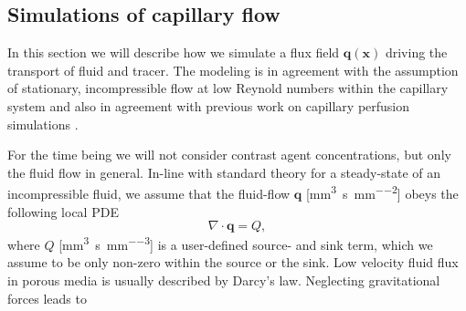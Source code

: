 \documentclass[journal,twocolumn]{IEEEtran}
\newcommand{\vq}{\mathbf{q}}
\newcommand{\vx}{\mathbf{x}}
\newcommand{\siQmm}{\milli\meter\cubed\per\second\per\milli\meter\cubed}
\newcommand{\siq}{\milli\meter\cubed\per\second\per\milli\meter\squared}
\newcommand{\siQtilde}{\milli\gram\per\second\per\milli\meter\cubed}
\begin{document}
	

	\subsection{Simulations of capillary flow}\label{sec:flow}
	In this section we will describe how we simulate a flux field $\vq(\vx)$ driving the transport of fluid and tracer.
	The modeling is in agreement with the assumption of stationary, incompressible flow at low Reynold numbers within the capillary system \cite{Cho2011} and also in agreement with previous work on capillary perfusion simulations \cite{Cookson2012,Michler2013}. 

	For the time being we will not consider contrast agent concentrations, but only the fluid flow in general.
	In-line with standard theory for a steady-state of an incompressible fluid, we assume that the fluid-flow $\vq$ [\si{\siq}] obeys the following local PDE
	\begin{equation}
		\nabla \cdot \vq = Q,
		\label{eq:syntcontsimp}
	\end{equation}	
	where $Q$ [\si{\siQmm}] is a user-defined source- and sink term, which we assume to be only non-zero within the source or the sink.
	Low velocity fluid flux in porous media is usually described by Darcy's law. 	Neglecting gravitational forces \cite{Darcy56} leads to
\end{document}

